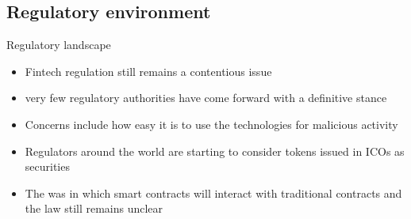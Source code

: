 \documentclass[9pt]{beamer}
\begin{document}


\subsection{Regulatory environment}

\begin{frame}{Regulatory landscape}
	\begin{itemize}
		\item Fintech regulation still remains a contentious issue
		\item very few regulatory authorities have come forward with a definitive stance
		\item Concerns include how easy it is to use the technologies for malicious activity
		\item Regulators around the world are starting to consider tokens issued in ICOs as securities
		\item The was in which smart contracts will interact with traditional contracts and the law still remains unclear
	\end{itemize}
\end{frame}
\end{document}
